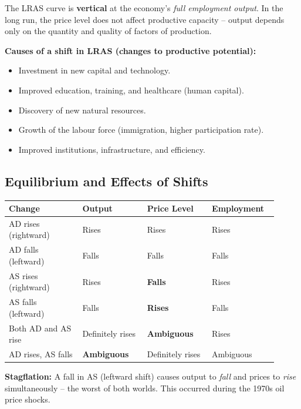 \documentclass[11pt, a4paper, twoside]{book}
\begin{document}
The LRAS curve is \textbf{vertical} at the economy's \emph{full employment output}. In the long run, the price level does not affect productive capacity -- output depends only on the quantity and quality of factors of production.

\textbf{Causes of a shift in LRAS (changes to productive potential):}
\begin{itemize}
  \item Investment in new capital and technology.
  \item Improved education, training, and healthcare (human capital).
  \item Discovery of new natural resources.
  \item Growth of the labour force (immigration, higher participation rate).
  \item Improved institutions, infrastructure, and efficiency.
\end{itemize}

\subsection{Equilibrium and Effects of Shifts}

\begin{tcolorbox}[enhanced,colback=LightBlue,colframe=MidBlue!70,arc=0pt,boxrule=0.8pt]
\begin{tabular}{@{}>{\RaggedRight\arraybackslash}p{0.25\linewidth}>{\RaggedRight\arraybackslash}p{0.22\linewidth}>{\RaggedRight\arraybackslash}p{0.22\linewidth}>{\RaggedRight\arraybackslash}p{0.22\linewidth}@{}}
\textbf{\color{NavyPrimary}Change} & \textbf{\color{NavyPrimary}Output} & \textbf{\color{NavyPrimary}Price Level} & \textbf{\color{NavyPrimary}Employment} \\
\midrule
AD rises (rightward) & Rises & Rises & Rises \\
AD falls (leftward) & Falls & Falls & Falls \\
AS rises (rightward) & Rises & \textbf{Falls} & Rises \\
AS falls (leftward) & Falls & \textbf{Rises} & Falls \\
\midrule
Both AD and AS rise & Definitely rises & \textbf{Ambiguous} & Rises \\
AD rises, AS falls & \textbf{Ambiguous} & Definitely rises & Ambiguous \\
\end{tabular}
\end{tcolorbox}

\begin{tcolorbox}[enhanced,colback=LightGold,colframe=GoldAccent,arc=0pt,boxrule=0.9pt,
  left=8pt,right=8pt,top=6pt,bottom=6pt]
\textbf{\color{NavyPrimary}Stagflation:} A fall in AS (leftward shift) causes output to \emph{fall} and prices to \emph{rise} simultaneously -- the worst of both worlds. This occurred during the 1970s oil price shocks.
\end{tcolorbox}
\end{document}
